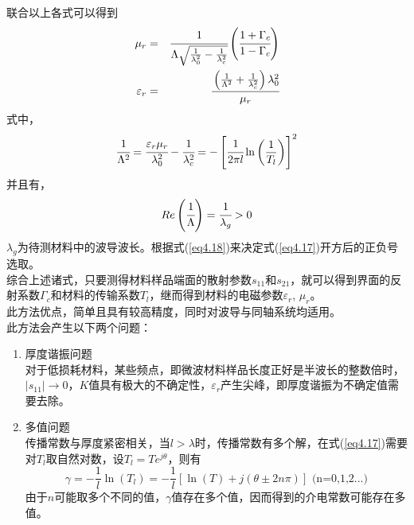 \documentclass[a4paper]{article}
\begin{document}
联合以上各式可以得到
\begin{eqnarray}
\mu_r &=& \cfrac{1}{\Lambda\sqrt{\frac{1}{\lambda_0^2}-\frac{1}{\lambda_c^2}}}\left(\cfrac{1+\Gamma_c}{1-\Gamma_c}\right)\\
\varepsilon_r &=& \cfrac{\left(\frac{1}{\Lambda^2}+\frac{1}{\lambda_c^2}\right)\lambda_0^2}{\mu_r}
\end{eqnarray}
式中，
\begin{equation}
\cfrac{1}{\Lambda^2} = \cfrac{\varepsilon_r\mu_r}{\lambda_0^2} - \cfrac{1}{\lambda_c^2} = -\left[\cfrac{1}{2\pi l}\ln\left(\frac{1}{T_l}\right)\right]^2\label{eq4.17}
\end{equation}
并且有，
\begin{equation}
Re\left(\cfrac{1}{\Lambda}\right) = \cfrac{1}{\lambda_g} > 0\label{eq4.18}
\end{equation}
$\lambda_g$为待测材料中的波导波长。根据式(\ref{eq4.18})来决定式(\ref{eq4.17})开方后的正负号选取。\\
综合上述诸式，只要测得材料样品端面的散射参数$s_{11}$和$s_{21}$，就可以得到界面的反射系数$\Gamma_c$和材料的传输系数$T_l$，继而得到材料的电磁参数$\varepsilon_r$, $\mu_r$。\\
此方法优点，简单且具有较高精度，同时对波导与同轴系统均适用。\\
此方法会产生以下两个问题：
\begin{enumerate}
\item 厚度谐振问题\\
对于低损耗材料，某些频点，即微波材料样品长度正好是半波长的整数倍时，$|s_{11}|\to 0$，$K$值具有极大的不确定性，$\varepsilon_r$产生尖峰，即厚度谐振为不确定值需要去除。
\item 多值问题\\
传播常数与厚度紧密相关，当$l > \lambda$时，传播常数有多个解，在式(\ref{eq4.17})需要对$T_l$取自然对数，设$T_l = Te^{j\theta}$，则有
\begin{equation}
\gamma = -\frac{1}{l}\ln(T_l) = -\frac{1}{l}\left[\ln(T)+j(\theta\pm 2n\pi)\right] \text{ (n=0,1,2...)}
\end{equation}
由于$n$可能取多个不同的值，$\gamma$值存在多个值，因而得到的介电常数可能存在多值。
\end{enumerate}
\end{document}
